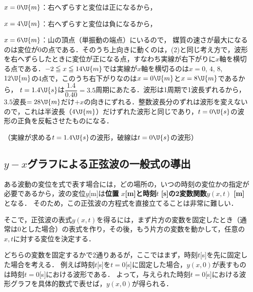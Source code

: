 \begin{reidaiunit}
\begin{kaitou}
\begin{komon}
       $x=0\U{m}$：右へずらすと変位は正になるから，\hspace*{\fill}\Ans

       $x=4\U{m}$：右へずらすと変位は負になるから，\hspace*{\fill}\Ans

       $x=6\U{m}$：山の頂点（単振動の端点）にいるので，\hspace*{\fill}\Ans
{} 媒質の速さが最大になるのは変位が0の点である．そのうち上向きに動くのは，(2)と同じ考え方で，波形を右へずらしたときに変位が正になる点，すなわち{\gtfamily 実線が右下がりに$x$軸を横切る点}である．$-2\leqq x\leqq 14\U{m}$では実線が$x$軸を横切るのは$x=0$, $4$, $8$, $12\U{m}$の4点で，このうち右下がりなのは$x=0\U{m}$と$x=8\U{m}$であるから，
 $t=1.4\U{s}$は$\dfrac{1.4}{0.40}=3.5$周期にあたる．波形は1周期で1波長ずれるから，$3.5$波長$=28\U{m}$だけ$+x$の向きにずれる．整数波長分のずれは波形を変えないので，これは半波長（$4\U{m}$）だけずれた波形と同じであり，$t=0\U{s}$の波形の正負を反転させたものになる．
       \begin{center}\end{center}
       \hspace{1zw}（実線が求める$t=1.4\U{s}$の波形，破線は$t=0\U{s}$の波形）\hspace*{\fill}\Ans
\end{komon}
\end{kaitou}
\end{reidaiunit}




\subsection{$y-x$グラフによる正弦波の一般式の導出}
ある波動の変位を式で表す場合には，どの場所の，いつの時刻の変位かの指定が必要であるから，波の変位$y$[m]は{\bf 位置} \mbox{\boldmath $x$}{\bf [m]と時刻}\mbox{\boldmath $t$} {\bf [s]の2変数関数}\mbox{\boldmath $y(x,t)$} {\bf[m]}となる．
そのため，この正弦波の方程式を直接立てることは非常に難しい．

そこで，正弦波の表式$y(x,t)$を得るには，まず片方の変数を固定したとき（通常は0とした場合）の表式を作り，その後，もう片方の変数を動かして，任意の$x,t$に対する変位を決定する．

どちらの変数を固定するかで2通りあるが，ここではまず，時刻$t$[s]を先に固定した場合を考える．
例えば時刻$t$[s]を$t=0$[s]に固定した場合，$y(x,0)$が表すものは時刻$t=0$[s]における波形である．
よって，与えられた時刻$t=0$[s]における波形グラフを具体的数式で表せば，$y(x,0)$が得られる．

